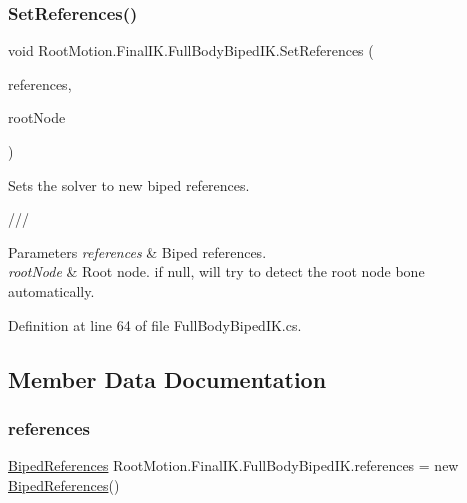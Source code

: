 \subsubsection{\texorpdfstring{Set\+References()}{SetReferences()}}
{\footnotesize\ttfamily void Root\+Motion.\+Final\+I\+K.\+Full\+Body\+Biped\+I\+K.\+Set\+References (\begin{DoxyParamCaption}\item[{\mbox{\hyperlink{class_root_motion_1_1_biped_references}{Biped\+References}}}]{references,  }\item[{Transform}]{root\+Node }\end{DoxyParamCaption})}



Sets the solver to new biped references. 

/// 
\begin{DoxyParams}{Parameters}
{\em references} & Biped references.\\
\hline
{\em root\+Node} & Root node. if null, will try to detect the root node bone automatically. \\
\hline
\end{DoxyParams}


Definition at line 64 of file Full\+Body\+Biped\+I\+K.\+cs.



\subsection{Member Data Documentation}
\mbox{\label{class_root_motion_1_1_final_i_k_1_1_full_body_biped_i_k_a0dfac5c2550dad76128806dd5fdc019b}} 
\subsubsection{\texorpdfstring{references}{references}}
{\footnotesize\ttfamily \mbox{\hyperlink{class_root_motion_1_1_biped_references}{Biped\+References}} Root\+Motion.\+Final\+I\+K.\+Full\+Body\+Biped\+I\+K.\+references = new \mbox{\hyperlink{class_root_motion_1_1_biped_references}{Biped\+References}}()}



